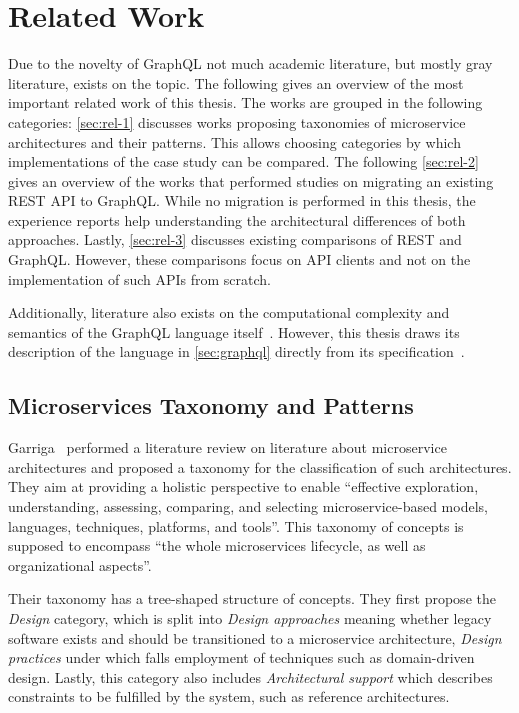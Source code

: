 \section{Related Work}\label{sec:related}

Due to the novelty of GraphQL not much academic literature, but mostly gray literature, exists on the topic.
The following gives an overview of the most important related work of this thesis.
The works are grouped in the following categories:
\autoref{sec:rel-1} discusses works proposing taxonomies of microservice architectures and their patterns.
This allows choosing categories by which implementations of the case study can be compared.
The following \autoref{sec:rel-2} gives an overview of the works that performed studies on migrating an existing \ac{REST} \ac{API} to GraphQL.
While no migration is performed in this thesis, the experience reports help understanding the architectural differences of both approaches.
Lastly, \autoref{sec:rel-3} discusses existing comparisons of \ac{REST} and GraphQL.
However, these comparisons focus on \ac{API} clients and not on the implementation of such \acp{API} from scratch.

Additionally, literature also exists on the computational complexity and semantics of the GraphQL language itself~\cite{Hartig2017, Hartig2018}.
However, this thesis draws its description of the language in \autoref{sec:graphql} directly from its specification~\cite{Facebook2018}.

\subsection{Microservices Taxonomy and Patterns}\label{sec:rel-1}

Garriga~\cite{Garriga2017} performed a literature review on literature about microservice architectures and proposed a taxonomy for the classification of such architectures.
They aim at providing a holistic perspective to enable ``effective exploration, understanding, assessing, comparing, and selecting microservice-based models, languages, techniques, platforms, and tools''.
This taxonomy of concepts is supposed to encompass ``the whole microservices lifecycle, as well as organizational aspects''.

Their taxonomy has a tree-shaped structure of concepts.
They first propose the \textit{Design} category, which is split into \textit{Design approaches} meaning whether legacy software exists and should be transitioned to a microservice architecture, \textit{Design practices} under which falls employment of techniques such as domain-driven design.
Lastly, this category also includes \textit{Architectural support} which describes constraints to be fulfilled by the system, such as reference architectures.

